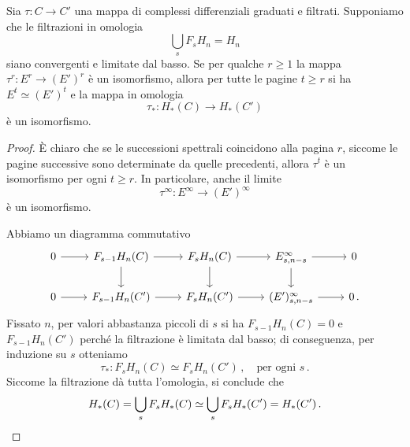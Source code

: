 	\begin{thm}
		Sia $\tau : C \to C'$ una mappa di complessi differenziali graduati e filtrati.
		Supponiamo che le filtrazioni in omologia 
		\begin{equation*}
			\bigcup_{s} F_{s}H_{n} = H_{n}
		\end{equation*}
		siano convergenti e limitate dal basso.
		Se per qualche $r \ge 1$ la mappa $\tau^{r} : E^{r} \to (E')^{r}$ è un isomorfismo,
		allora per tutte le pagine $t \ge r$ si ha $E^{t} \simeq (E')^{t}$ e
		la mappa in omologia
		\begin{equation*}
			\tau_{*} : H_{*}(C) \longrightarrow H_{*}(C')
		\end{equation*}
		è un isomorfismo.
		\begin{proof}
			\`E chiaro che se le successioni spettrali
			coincidono alla pagina $r$, siccome le pagine successive
			sono determinate da quelle precedenti, allora
			$\tau^{t}$ è un isomorfismo per ogni $t \ge r$.
			In particolare, anche il limite
			\begin{equation*}
				\tau^{\infty} : E^{\infty} \longrightarrow (E')^{\infty}
			\end{equation*}
			è un isomorfismo.
			
			Abbiamo un diagramma commutativo
			\begin{equation*}
				\begin{tikzcd}
					0 \ar[r]
					& F_{s-1}H_{n}(C) \ar[r] \ar[d]
					& F_{s}H_{n}(C) \ar[r] \ar[d]
					& E^{\infty}_{s,n-s} \ar[r] \ar[d]
					& 0 \\
					0 \ar[r]
					& F_{s-1}H_{n}(C') \ar[r]
					& F_{s}H_{n}(C') \ar[r]
					& (E')^{\infty}_{s,n-s} \ar[r]
					& 0 \,.
				\end{tikzcd}
			\end{equation*}
			Fissato $n$, per valori abbastanza piccoli di $s$
			si ha $F_{s-1}H_{n}(C) = 0$ e $F_{s-1}H_{n}(C')$ perché la filtrazione è limitata dal basso;
			di conseguenza, per induzione su $s$ otteniamo
			\begin{equation*}
				\tau_{*} : F_{s}H_{n}(C) \simeq F_{s}H_{n}(C')\,,
				\quad \text{per ogni } s\,.
			\end{equation*}
			Siccome la filtrazione dà tutta l'omologia, si conclude che
			\begin{equation*}
				H_{*}(C) = \bigcup_{s} F_{s}H_{*}(C)
				\simeq  \bigcup_{s} F_{s}H_{*}(C') = H_{*}(C')\,. \qedhere
			\end{equation*}
		\end{proof}
	\end{thm}
	
